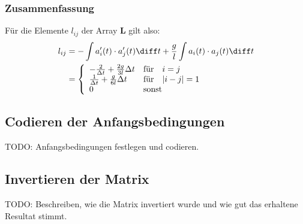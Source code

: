 \subsubsection{Zusammenfassung} %
Für die Elemente $l_{ij}$ der Array $\mathbf{L}$ gilt also:
\begin{equation}
    \begin{aligned}
        l_{ij} 
        &= - \int a_i'(t) \cdot a_j'(t) \diff t + \frac{g}{l} \int a_i(t) \cdot a_j(t) \diff t \\
        &=  \left\{ 
                \begin{array}{ll}
                    - \frac{2}{\Delta t} + \frac{2g}{3l} \Delta t & \text{für} \quad i = j \\
                    \frac{1}{\Delta t} + \frac{g}{6l} \Delta t & \text{für} \quad |i - j| = 1 \\
                    0 & \text{sonst}
                \end{array} 
            \right.
    \end{aligned}
\end{equation}


\subsection{Codieren der Anfangsbedingungen}
TODO: Anfangsbedingungen festlegen und codieren.

\subsection{Invertieren der Matrix}
TODO: Beschreiben, wie die Matrix invertiert wurde und wie gut das erhaltene Resultat stimmt.